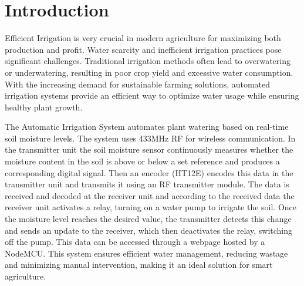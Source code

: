 \documentclass[12pt, a4paper]{report}
\newcommand{\chapterFont}{\fontsize{18}{18}\selectfont}
\newcommand{\doindent}{\setlength\parindent{1cm}}
\begin{document}
\newpage

\renewcommand{\contentsname}{Table of contents}
\renewcommand{\cfttoctitlefont}{\chapterFont}
\renewcommand{\cftbeforetoctitleskip}{0pt}
\renewcommand{\cftbeforeloftitleskip}{0pt}
\renewcommand{\cftbeforelottitleskip}{0pt}
\renewcommand{\cftaftertoctitleskip}{10pt}
\renewcommand{\cftafterlottitleskip}{10pt}
\renewcommand{\cftafterloftitleskip}{10pt}
\renewcommand{\cftlottitlefont}{\chapterFont}
\renewcommand{\cftloftitlefont}{\chapterFont}

\renewcommand{\cftdotsep}{4}
\renewcommand{\cftsecleader}{\cftdotfill{\cftdotsep}}
\renewcommand{\cftsubsecleader}{\cftdotfill{\cftdotsep}}
\renewcommand{\cftpartleader}{\cftdotfill{\cftdotsep}} %
\renewcommand{\cftchapleader}{\cftdotfill{\cftdotsep}}


\tableofcontents

\newpage
{}

\cleardoublepage
{}
{}
\listoffigures

\newpage

\cleardoublepage
{}
{}
\listoftables
\newpage

\doindent
{}
\chapter{Introduction}
\setlength\parindent{1cm}

Efficient Irrigation is very crucial in modern agriculture for
maximizing both production and profit. Water scarcity and inefficient
irrigation practices pose significant challenges. Traditional
irrigation methods often lead to overwatering or underwatering,
resulting in poor crop yield and excessive water consumption. With
the increasing demand for sustainable farming solutions, automated
irrigation systems provide an efficient way to optimize water usage
while ensuring healthy plant growth.

The Automatic Irrigation System automates plant watering based on
real-time soil moisture levels. The system uses 433MHz RF for
wireless communication. In the transmitter unit the soil moisture
sensor continuously measures whether the moisture content in the soil
is above or below a set reference and produces a corresponding
digital signal. Then an encoder (HT12E) encodes this data in the
transmitter unit and transmits it using an RF transmitter module. The
data is received and decoded at the receiver unit and according to
the received data the receiver unit activates a relay, turning on a
water pump to irrigate the soil. Once the moisture level reaches the
desired value, the transmitter detects this change and sends an
update to the receiver, which then deactivates the relay, switching
off the pump. This data can be accessed through a webpage hosted by a
NodeMCU. This system ensures efficient water management, reducing
wastage and minimizing manual intervention, making it an ideal
solution for smart agriculture.
\end{document}

